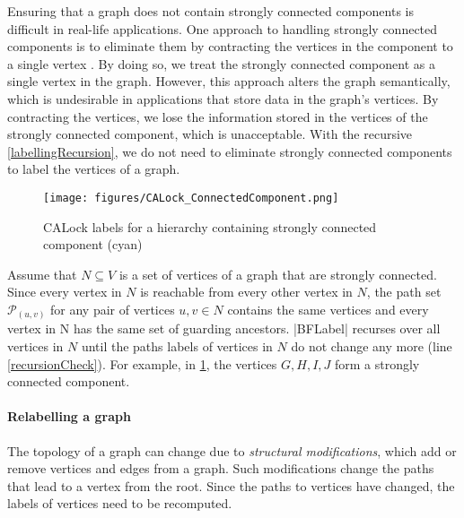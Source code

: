 Ensuring that a graph does not contain strongly connected components is difficult in real-life applications. 
One approach to handling strongly connected components is to eliminate them by contracting the vertices in the component to a single vertex \cite{sharir1981strong, tarjan1972depth, cheriyan1996algorithms,walsh2006hub}. By doing so, we treat the strongly connected component as a single vertex in the graph. 
However, this approach alters the graph semantically, which is undesirable in applications that store data in the graph's vertices. By contracting the vertices, we lose the information stored in the vertices of the strongly connected component, which is unacceptable. 
With the recursive \cref{labellingRecursion}, we do not need to eliminate strongly connected components to label the vertices of a graph. 


\begin{figure}
	\centering
	\captionsetup{justification=centering}
	\texttt{[image: figures/CALock\_ConnectedComponent.png]}
	\caption{CALock labels for a hierarchy containing strongly connected component (cyan)}
	\label{fig:stronglyConnectedComponent}
\end{figure}

Assume that $N \subseteq V$ is a set of vertices of a graph that are strongly connected. Since every vertex in $N$ is reachable from every other vertex in $N$, the path set $\mathcal{P}_{(u,v)}$ for any pair of vertices $u, v\in N$ contains the same vertices and every vertex in N has the same set of guarding ancestors. \inline|BFLabel| recurses over all vertices in $N$ until the paths labels of vertices in $N$ do not change any more (line \ref{recursionCheck}).
For example, in \cref{fig:stronglyConnectedComponent}, the vertices $G, H, I, J$ form a strongly connected component. 

\paragraph{Relabelling a graph}

The topology of a graph can change due to \emph{structural modifications}, which add or remove vertices and edges from a graph. 
Such modifications change the paths that lead to a vertex from the root.
Since the paths to vertices have changed, the labels of vertices need to be recomputed.

